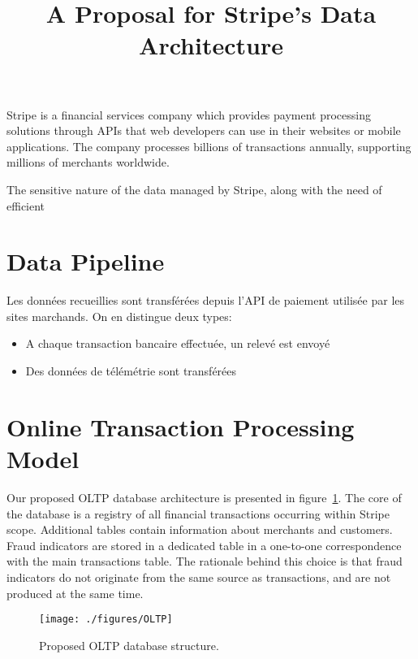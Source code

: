 \documentclass[11pt,a4paper,computermodern]{article}
\title{A Proposal for Stripe's Data Architecture}
\date{}
\begin{document}
\maketitle

\vspace{-10mm}

Stripe is a financial services company which provides payment processing solutions through APIs that web developers can use in their websites or mobile applications. The company processes billions of transactions annually, supporting millions of merchants worldwide.

The sensitive nature of the data managed by Stripe, along with the need of efficient


\section*{Data Pipeline}

Les données recueillies sont transférées depuis l'API de paiement utilisée par les sites marchands. On en distingue deux types:
\begin{itemize}
	\item A chaque transaction bancaire effectuée, un relevé est envoyé 
	\item Des données de télémétrie sont transférées
\end{itemize}


\section*{Online Transaction Processing Model}

Our proposed OLTP database architecture is presented in figure~\ref{fig:OLTP}. The core of the database is a registry of all financial transactions occurring within Stripe scope. Additional tables contain information about merchants and customers. Fraud indicators are stored in a dedicated table in a one-to-one correspondence with the main transactions table. The rationale behind this choice is that fraud indicators do not originate from the same source as transactions, and are not produced at the same time.


\begin{figure}
	\centering
	\texttt{[image: ./figures/OLTP]}
	\caption{Proposed OLTP database structure.}
	\label{fig:OLTP}
\end{figure}
\end{document}

